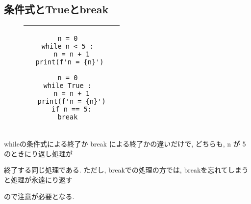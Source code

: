 \documentclass{jsarticle}
\begin{document}
\subsection{条件式とTrueとbreak}
\begin{figure}[h]
	\begin{tabular}{cc}
		\begin{minipage}[c]{.45\textwidth}
			\begin{lstlisting}[caption=条件式による繰り返しの終了]
n = 0
while n < 5 :
  n = n + 1
  print(f'n = {n}') \end{lstlisting}
		\end{minipage} \hspace{3mm}
		\begin{minipage}[c]{.55\textwidth}
			\begin{lstlisting}[caption=break による繰り返しの終了]
n = 0
while True :
  n = n + 1
  print(f'n = {n}')
  if n == 5:
    break    \end{lstlisting}
		\end{minipage}
	\end{tabular}
\end{figure}
\begin{screen}
	whileの条件式による終了か break による終了かの違いだけで, どちらも, n が 5 のときにり返し処理が \par
	終了する同じ処理である. ただし, breakでの処理の方では, breakを忘れてしまうと処理が永遠にり返す\par
	ので注意が必要となる.
\end{screen}
\newpage
\end{document}
